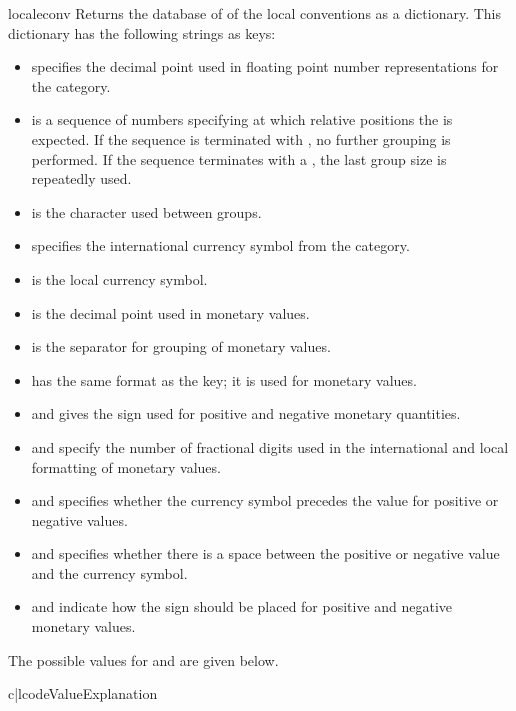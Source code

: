 \begin{funcdesc}{localeconv}{}
Returns the database of of the local conventions as a dictionary. This
dictionary has the following strings as keys:
\begin{itemize}
\item {} specifies the decimal point used in
floating point number representations for the 
category.
\item {} is a sequence of numbers specifying at which
relative positions the  is expected. If the
sequence is terminated with , no further
grouping is performed. If the sequence terminates with a , the last
group size is repeatedly used.
\item {} is the character used between groups.
\item {} specifies the international currency
symbol from the  category.
\item {} is the local currency symbol.
\item {} is the decimal point used in monetary
values.
\item {} is the separator for grouping of
monetary values.
\item {} has the same format as the 
key; it is used for monetary values.
\item {} and  gives the sign
used for positive and negative monetary quantities.
\item {} and  specify the number
of fractional digits used in the international and local formatting
of monetary values.
\item {} and  specifies whether
the currency symbol precedes the value for positive or negative
values.
\item {} and  specifies
whether there is a space between the positive or negative value and
the currency symbol.
\item {} and  indicate how the
sign should be placed for positive and negative monetary values. 
\end{itemize}

The possible values for  and 
are given below.

\begin{tableii}{c|l}{code}{Value}{Explanation}
\end{tableii}
\end{funcdesc}

